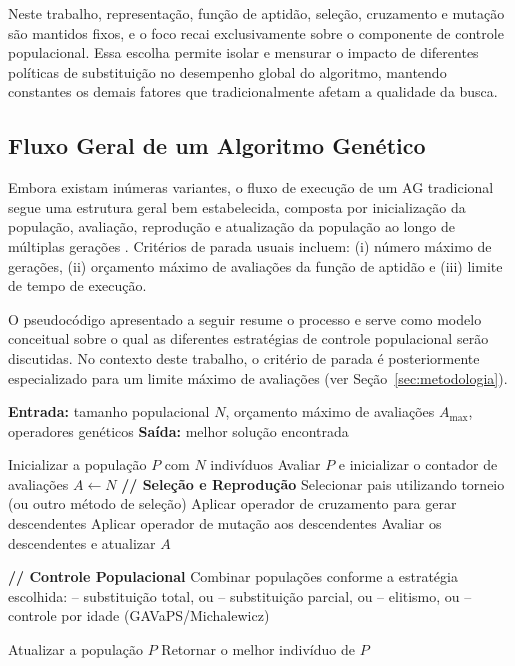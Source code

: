 Neste trabalho, representação, função de aptidão, seleção, cruzamento e mutação são mantidos fixos, e o foco recai exclusivamente sobre o componente de controle populacional. Essa escolha permite isolar e mensurar o impacto de diferentes políticas de substituição no desempenho global do algoritmo, mantendo constantes os demais fatores que tradicionalmente afetam a qualidade da busca.

\subsection{Fluxo Geral de um Algoritmo Genético}

Embora existam inúmeras variantes, o fluxo de execução de um AG tradicional segue uma estrutura geral bem estabelecida, composta por inicialização da população, avaliação, reprodução e atualização da população ao longo de múltiplas gerações \cite{eiben2015introduction,mitchell1998introduction}. Critérios de parada usuais incluem: (i) número máximo de gerações, (ii) orçamento máximo de avaliações da função de aptidão e (iii) limite de tempo de execução. 

O pseudocódigo apresentado a seguir resume o processo e serve como modelo conceitual sobre o qual as diferentes estratégias de controle populacional serão discutidas. No contexto deste trabalho, o critério de parada é posteriormente especializado para um limite máximo de avaliações (ver Seção~\ref{sec:metodologia}).


\begin{algorithm}[H]
\caption{Pseudocódigo de um Algoritmo Genético Clássico}
\label{alg:ag-classico}
\begin{algorithmic}[1]
\Statex \textbf{Entrada:} tamanho populacional $N$, orçamento máximo de avaliações $A_{\max}$, operadores genéticos
\Statex \textbf{Saída:} melhor solução encontrada
\Statex

\State Inicializar a população $P$ com $N$ indivíduos
\State Avaliar $P$ e inicializar o contador de avaliações $A \leftarrow N$
    \Statex \textbf{// Seleção e Reprodução}
    \State Selecionar pais utilizando torneio (ou outro método de seleção)
    \State Aplicar operador de cruzamento para gerar descendentes
    \State Aplicar operador de mutação aos descendentes
    \State Avaliar os descendentes e atualizar $A$

    \Statex \textbf{// Controle Populacional}
    \State Combinar populações conforme a estratégia escolhida:
    \Statex \quad -- substituição total, ou
    \Statex \quad -- substituição parcial, ou
    \Statex \quad -- elitismo, ou
    \Statex \quad -- controle por idade (GAVaPS/Michalewicz)

    \State Atualizar a população $P$
\EndWhile
\State Retornar o melhor indivíduo de $P$
\end{algorithmic}
\end{algorithm}

